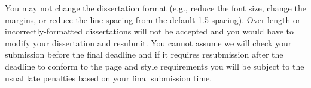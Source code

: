 \documentclass[msc,deptreport]{infthesis} %
\begin{document}
You may not change the dissertation format (e.g., reduce the font
size, change the margins, or reduce the line spacing from the default
1.5 spacing). Over length or incorrectly-formatted dissertations will
not be accepted and you would have to modify your dissertation and
resubmit.  You cannot assume we will check your submission before the
final deadline and if it requires resubmission after the deadline to
conform to the page and style requirements you will be subject to the
usual late penalties based on your final submission time.




% 
% 
% 
\end{document}
